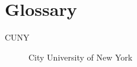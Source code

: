 \chapter*{Glossary}

\begin{description}
    \item[CUNY] City University of New York
\end{description}

